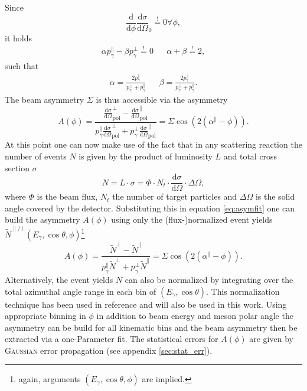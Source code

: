 Since $$\frac{\text{d}}{\text{d}\phi}\frac{\text{d}\sigma}{\text{d}\Omega}_0\overset{!}{=}0\forall\phi,$$ it holds \begin{align}
	\alpha p_\gamma^\parallel-\beta p_\gamma^\bot \overset{!}{=}0 && \alpha+\beta\overset{!}{=}2,
\end{align}
such that
\begin{align}
	\alpha =\frac{2p_\gamma^\parallel}{p_\gamma^\bot+p_\gamma^\parallel} && \beta=\frac{2p_\gamma^\bot}{p_\gamma^\bot+p_\gamma^\parallel}.
	\label{eq:alphabeta}
\end{align}
The beam asymmetry $\Sigma$ is thus accessible via the asymmetry \begin{equation}
	A(\phi)=\frac{\frac{\text{d}\sigma}{\text{d}\Omega}_\text{pol}^\bot-\frac{\text{d}\sigma}{\text{d}\Omega}_\text{pol}^\parallel}{p_\gamma^\parallel\frac{\text{d}\sigma}{\text{d}\Omega}_\text{pol}^\bot+p_\gamma^\bot\frac{\text{d}\sigma}{\text{d}\Omega}_\text{pol}^\parallel}=\Sigma\cos\left(2\left(\alpha^\parallel-\phi\right)\right).
	\label{eq:asymfit}
\end{equation}
At this point one can now make use of the fact that in any scattering reaction the number of events $N$ is given by the product of luminosity $L$ and total cross section $\sigma$ $$N=L\cdot\sigma=\Phi\cdot N_t\cdot\frac{\text{d}\sigma}{\text{d}\Omega}\cdot\Delta\Omega,$$
where $\Phi$ is the beam flux, $N_t$ the number of target particles and $\Delta\Omega$ is the solid angle covered by the detector. Substituting this in equation \eqref{eq:asymfit} one can build the asymmetry $A(\phi)$ using only the (flux-)normalized event yields $\tilde{N}^{\parallel/\bot}\left(E_\gamma,\cos\theta,\phi\right)$\footnote{again, arguments $\left(E_\gamma,\cos\theta,\phi\right)$ are implied.}
\begin{equation}
	A(\phi)=\frac{\tilde{N}^\bot-\tilde{N}^\parallel}{p_\gamma^\parallel\tilde{N}^\bot+p_\gamma^\bot\tilde{N}^\parallel}=\Sigma\cos\left(2\left(\alpha^\parallel-\phi\right)\right).
	\label{eq:evyieldasym}
\end{equation}
Alternatively, the event yields $N$ can also be normalized by integrating over the total azimuthal angle range in each bin of $(E_\gamma,\cos\theta)$. This normalization technique has been used in reference \cite{farahphd} and will also be used in this work. Using appropriate binning in $\phi$ in addition to beam energy and meson polar angle the asymmetry can be build for all kinematic bins and the beam asymmetry then be extracted via a one-Parameter fit. The statistical errors for $A(\phi)$ are given by \textsc{Gaussian} error propagation (see appendix \ref{sec:stat_err}). 
